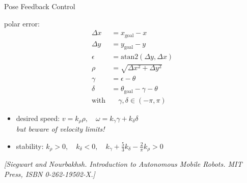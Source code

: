 \documentclass{beamer}
\begin{document}
\begin{frame}{Pose Feedback Control}
  
  \begin{minipage}{0.45\columnwidth}
    \def\svgwidth{\columnwidth}
    
  \end{minipage}
  \begin{minipage}{0.5\columnwidth}
    polar error:
    \vspace{-\baselineskip}
    \begin{align*}
      \Delta x
      &=
      x_\text{goal} - x
      \\
      \Delta y
      &=
      y_\text{goal} - y
      \\
      \epsilon
      &=
      \text{atan2}(\Delta y, \Delta x)
      \\
      \rho
      &=
      \sqrt{\Delta x^2 + \Delta y^2}
      \\
      \gamma
      &=
      \epsilon - \theta
      \\
      \delta
      &=
      \theta_\text{goal} - \gamma - \theta
      \\
      \text{with}
      &\quad
      \gamma, \delta \in (-\pi, \pi)
    \end{align*}
  \end{minipage}
  
  \vfill
  \begin{itemize}
  \item
    desired speed:
    $v = k_\rho \rho,\quad \omega = k_\gamma \gamma + k_\delta \delta$\\
    \emph{but beware of velocity limits!}
  \item
    stability:
    $k_\rho > 0,\quad k_\delta < 0,\quad k_\gamma + \frac{5}{3}k_\delta - \frac{2}{\pi}k_\rho > 0$
  \end{itemize}
  
  \hfill\tiny\emph{[Siegwart and Nourbakhsh. Introduction to Autonomous Mobile Robots. MIT Press, ISBN 0-262-19502-X.]}
\end{frame}
\end{document}

